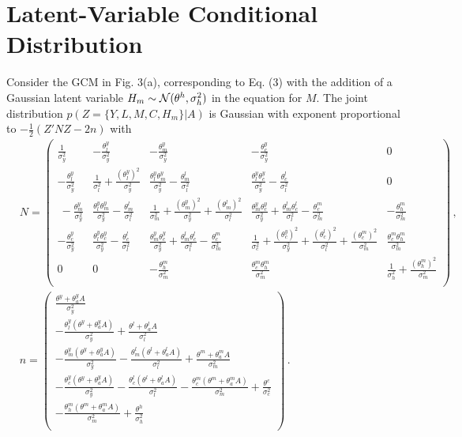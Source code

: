\documentclass{article}
\begin{document}
\section{Latent-Variable Conditional Distribution}
Consider the GCM in Fig. 3(a), corresponding to Eq. (3) with the addition of a Gaussian latent variable $H_m\sim {\cal N}(\theta^h,\sigma^2_h)$ in the equation for $M$.
The joint distribution $p(Z=\{Y,L,M,C,H_m\}|A)$ is Gaussian with exponent proportional to $-\frac{1}{2}(Z'NZ -2n)$
with 
\begin{align*}
&N=
\left(
\begin{array}{ccccc}
\frac{1}{\sigma^2_y} & -\frac{\theta^y_l}{\sigma^2_y} & -\frac{\theta^y_m}{\sigma^2_y}  & -\frac{\theta^y_c}{\sigma^2_y}  & 0\\
-\frac{\theta^y_l}{\sigma^2_y} & \frac{1}{\sigma^2_l}+\frac{(\theta^y_l)^2}{\sigma^2_y} & \frac{\theta^y_l\theta^y_m}{\sigma^2_y} - \frac{\theta^l_m}{\sigma^2_l} & \frac{\theta^y_l\theta^y_c}{\sigma^2_y}  - \frac{\theta^l_c}{\sigma^2_l} & 0\\\
-\frac{\theta^y_m}{\sigma^2_y} & \frac{\theta^y_l\theta^y_m}{\sigma^2_y}  - \frac{\theta^l_m}{\sigma^2_l} & \frac{1}{\sigma^2_m}+\frac{(\theta^y_m)^2}{\sigma^2_y}+\frac{(\theta^l_m)^2}{\sigma^2_l} & \frac{\theta^y_m\theta^y_c}{\sigma^2_y} + \frac{\theta^l_m\theta^l_c}{\sigma^2_l} - \frac{\theta^m_c}{\sigma^2_m} & -\frac{\theta^m_h}{\sigma^2_{m}}\\
-\frac{\theta^y_c}{\sigma^2_y} &  \frac{\theta^y_l\theta^y_c}{\sigma^2_y} - \frac{\theta^l_c}{\sigma^2_l}  & \frac{\theta^y_m\theta^y_c}{\sigma^2_y} + \frac{\theta^l_m\theta^l_c}{\sigma^2_l} - \frac{\theta^m_c}{\sigma^2_m}  &\frac{1}{\sigma^2_c}+\frac{(\theta^y_c)^2}{\sigma^2_y}+\frac{(\theta^l_c)^2}{\sigma^2_l}+\frac{(\theta^m_c)^2}{\sigma^2_m} &  \frac{\theta^m_c\theta^m_h}{\sigma^2_{m}}  \\
0 & 0 & -\frac{\theta^m_h}{\sigma^2_{m}} &  \frac{\theta^m_c\theta^m_h}{\sigma^2_{m}} & \frac{1}{\sigma^2_{h}} + \frac{(\theta^m_h)^2}{\sigma^2_m} \\
\end{array} \right)\,,
\\[5pt]
&n=\left(
\begin{array}{c}
\frac{\theta^y+\theta^y_aA}{\sigma^2_y}\\
-\frac{\theta^y_l(\theta^y+\theta^y_aA)}{\sigma^2_y} +\frac{\theta^l+\theta^l_aA}{\sigma^2_l}\\
-\frac{\theta^y_m(\theta^y+\theta^y_aA)}{\sigma^2_y} -\frac{\theta^l_m(\theta^l+\theta^l_aA)}{\sigma^2_l}+\frac{\theta^m+\theta^m_aA}{\sigma^2_m}\\
-\frac{\theta^y_c(\theta^y+\theta^y_aA)}{\sigma^2_y} -\frac{\theta^l_c(\theta^l+\theta^l_aA)}{\sigma^2_l}-\frac{\theta^m_c(\theta^m+\theta^m_aA)}{\sigma^2_m}+\frac{\theta^c}{\sigma^2_c}\\
-\frac{\theta^m_h(\theta^m+\theta^m_aA)}{\sigma^2_m}+\frac{\theta^h}{\sigma^2_h}\\
\end{array} \right)\,.
\end{align*}
\end{document}
